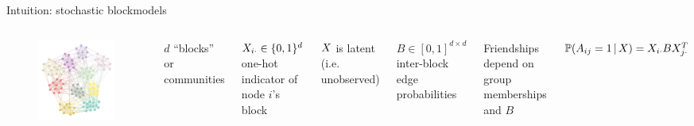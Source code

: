 \documentclass[aspectratio=169]{beamer}
\theoremstyle{remark}
\begin{document}
\begin{frame}{Intuition: stochastic blockmodels}

    \begin{columns}

        \begin{figure}
            \includegraphics[width=\textwidth]{figures/assortative.png}
        \end{figure}


        $d$ ``blocks'' or communities

        $X_{i \cdot} \in \{0, 1\}^d$ one-hot indicator of node $i$'s block

        \vspace{4mm}

        $X$ is latent (i.e. unobserved)

        \vspace{4mm}

        $B \in [0, 1]^{d \times d}$ inter-block edge probabilities

        \vspace{4mm}

        Friendships depend on group memberships and $B$

        $\P[\X]{A_{ij} = 1} = \X_{i \cdot} B \X_{j \cdot}^T$

    \end{columns}

\end{frame}
\end{document}

